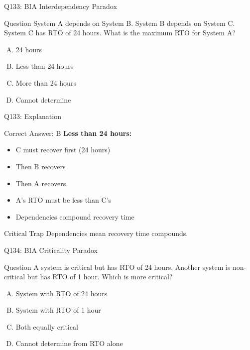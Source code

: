 \documentclass{beamer}
\begin{document}
	\begin{frame}{Q133: BIA Interdependency Paradox}
		\begin{block}{Question}
			System A depends on System B. System B depends on System C. System C has RTO of 24 hours. What is the maximum RTO for System A?
		\end{block}
		\begin{enumerate}[(A)]
			\item 24 hours
			\item Less than 24 hours
			\item More than 24 hours
			\item Cannot determine
		\end{enumerate}
	\end{frame}
	
	\begin{frame}{Q133: Explanation}
		\begin{block}{Correct Answer: B}
			\textbf{Less than 24 hours:}
			\begin{itemize}
				\item C must recover first (24 hours)
				\item Then B recovers
				\item Then A recovers
				\item A's RTO must be less than C's
				\item Dependencies compound recovery time
			\end{itemize}
		\end{block}
		\begin{alertblock}{Critical Trap}
			Dependencies mean recovery time compounds.
		\end{alertblock}
	\end{frame}
	
	\begin{frame}{Q134: BIA Criticality Paradox}
		\begin{block}{Question}
			A system is critical but has RTO of 24 hours. Another system is non-critical but has RTO of 1 hour. Which is more critical?
		\end{block}
		\begin{enumerate}[(A)]
			\item System with RTO of 24 hours
			\item System with RTO of 1 hour
			\item Both equally critical
			\item Cannot determine from RTO alone
		\end{enumerate}
	\end{frame}
	
\end{document}
